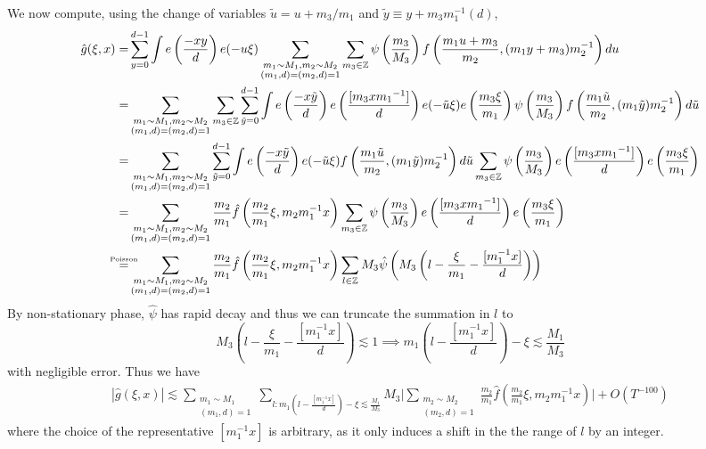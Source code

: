 We now compute, using the change of variables $\tilde{u}=u+m_3/m_1$ and $\tilde{y}\equiv y + m_3 m_1^{-1} (d)$, \begin{align*}
    \hat{g}(\xi,x)=&\sum_{y=0}^{d-1}\int 
    e\left(\frac{-xy}{d}\right)e(-u\xi)
    \sum_{\substack{m_1\sim M_1,m_2\sim M_2\\ (m_1,d)=(m_2,d)=1}} \sum_{m_3\in \mathbb{Z}} \psi\left(\frac{m_3}{M_3}\right)f\left(\frac{m_1 u+m_3}{m_2} , (m_1 y+m_3)m_2^{-1}\right) du\\
    =& 
    \sum_{\substack{m_1\sim M_1,m_2\sim M_2\\ (m_1,d)=(m_2,d)=1}} \sum_{m_3\in \mathbb{Z}} \sum_{\tilde{y}=0}^{d-1}\int 
    e\left(\frac{-x\tilde{y}}{d}\right) e\left(\frac{[{m_3x}{m_1}^{-1}]}{d}\right)e(-\tilde{u}\xi) e\left(\frac{m_3\xi}{m_1}\right)\psi\left(\frac{m_3}{M_3}\right)f\left(\frac{m_1 \tilde{u}}{m_2} , (m_1 \tilde{y})m_2^{-1}\right) d\tilde{u}\\
    =& \sum_{\substack{m_1\sim M_1,m_2\sim M_2\\ (m_1,d)=(m_2,d)=1}} \sum_{\tilde{y}=0}^{d-1}\int e\left(\frac{-x\tilde{y}}{d}\right)e(-\tilde{u}\xi) f\left(\frac{m_1 \tilde{u}}{m_2} , (m_1 \tilde{y})m_2^{-1}\right) d\tilde{u}
    \sum_{m_3\in \mathbb{Z}}
    \psi\left(\frac{m_3}{M_3}\right)e\left(\frac{[{m_3x}{m_1}^{-1}]}{d}\right)e\left(\frac{m_3\xi}{m_1}\right)\\
    =&\sum_{\substack{m_1\sim M_1,m_2\sim M_2\\ (m_1,d)=(m_2,d)=1}} \frac{m_2}{m_1}\hat{f}\left(\frac{m_2}{m_1}\xi, m_2 m_1^{-1}x\right)
    \sum_{m_3\in \mathbb{Z}}
    \psi\left(\frac{m_3}{M_3}\right)e\left(\frac{[{m_3x}{m_1}^{-1}]}{d}\right)e\left(\frac{m_3\xi}{m_1}\right)\\
    \stackon{Poisson}{=}&\sum_{\substack{m_1\sim M_1,m_2\sim M_2\\ (m_1,d)=(m_2,d)=1}} \frac{m_2}{m_1}\hat{f}\left(\frac{m_2}{m_1}\xi, m_2 m_1^{-1}x\right)
    \sum_{l\in \mathbb{Z}}M_3
    \hat{\psi}\left(M_3\left(l-\frac{\xi}{m_1}-\frac{[m_1^{-1}x]}{d}\right)\right)
\end{align*}
By non-stationary phase, $\hat{\psi}$ has rapid decay and thus we can truncate the summation in $l$ to \[
    M_3\left(l-\frac{\xi}{m_1}-\frac{[m_1^{-1}x]}{d}\right) \lesssim 1 \implies  m_1\left(l-\frac{[m_1^{-1}x]}{d}\right)- \xi \lesssim \frac{M_1}{M_3}
\]
with negligible error.
Thus we have \begin{align*}
    |\hat{g}(\xi,x)|\lesssim 
    \sum_{\substack{m_1\sim M_1\\(m_1,d)=1}} 
    \sum_{l : m_1\left(l-\frac{[m_1^{-1}x]}{d}\right)- \xi \lesssim \frac{M_1}{M_3} } M_3\Bigg|
    \sum_{\substack{m_2\sim M_2\\(m_2,d)=1}} \frac{m_2}{m_1}\hat{f}\left(\frac{m_2}{m_1}\xi, m_2 m_1^{-1}x\right) 
    \Bigg|+ O(T^{-100})
\end{align*}
where the choice of the representative $[m_1^{-1}x]$ is arbitrary, as it only induces a shift in the the range of $l$ by an integer.

